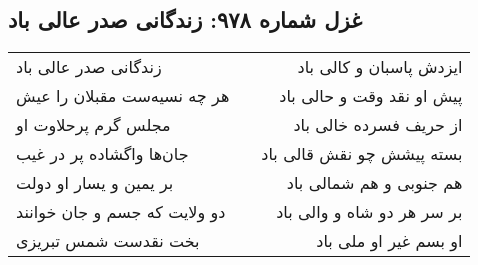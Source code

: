 \begin{center}
\section*{غزل شماره ۹۷۸: زندگانی صدر عالی باد}
\label{sec:0978}
\begin{longtable}{l p{0.5cm} r}
زندگانی صدر عالی باد
&&
ایزدش پاسبان و کالی باد
\\
هر چه نسیه‌ست مقبلان را عیش
&&
پیش او نقد وقت و حالی باد
\\
مجلس گرم پرحلاوت او
&&
از حریف فسرده خالی باد
\\
جان‌ها واگشاده پر در غیب
&&
بسته پیشش چو نقش قالی باد
\\
بر یمین و یسار او دولت
&&
هم جنوبی و هم شمالی باد
\\
دو ولایت که جسم و جان خوانند
&&
بر سر هر دو شاه و والی باد
\\
بخت نقدست شمس تبریزی
&&
او بسم غیر او ملی باد
\\
\end{longtable}
\end{center}
